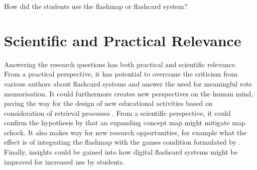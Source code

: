 \label{howused}
 How did the students use the flashmap or flashcard system?

\section{Scientific and Practical Relevance}

Answering the research questions has both practical and scientific relevance. From a practical perspective, it has potential to overcome the criticism from various authors about flashcard systems and answer the need for meaningful rote memorisation. It could furthermore creates new perspectives on the human mind, paving the way for the design of new educational activities based on consideration of retrieval processes \cite{karpicke2}. From a scientific perspective, it could confirm the hypothesis by  that an expanding concept map might mitigate map schock. It also makes way for new research opportunities, for example what the effect is of integrating the flashmap with the games condition formulated by . Finally, insights could be gained into how digital flashcard systems might be improved for increased use by students.

